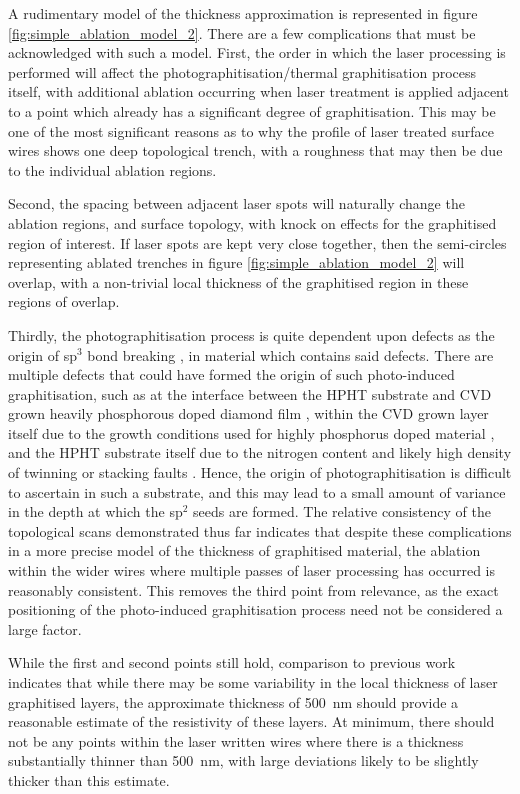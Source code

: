 \begin{refsection}
A rudimentary model of the thickness approximation is represented in figure \ref{fig:simple_ablation_model_2}. There are a few complications that must be acknowledged with such a model. First, the order in which the laser processing is performed will affect the photographitisation/thermal graphitisation process itself, with additional ablation occurring when laser treatment is applied adjacent to a point which already has a significant degree of graphitisation. This may be one of the most significant reasons as to why the profile of laser treated surface wires shows one deep topological trench, with a roughness that may then be due to the individual ablation regions. 

Second, the spacing between adjacent laser spots will naturally change the ablation regions, and surface topology, with knock on effects for the graphitised region of interest. If laser spots are kept very close together, then the semi-circles representing ablated trenches in figure \ref{fig:simple_ablation_model_2} will overlap, with a non-trivial local thickness of the graphitised region in these regions of overlap. 

Thirdly, the photographitisation process is quite dependent upon defects as the origin of sp$^{3}$ bond breaking \cite{kononenko2014-PI}, in material which contains said defects. There are multiple defects that could have formed the origin of such photo-induced graphitisation, such as at the interface between the HPHT substrate and CVD grown heavily phosphorous doped diamond film \cite{tallaire2011}, within the CVD grown layer itself due to the growth conditions used for highly phosphorus doped material \cite{grotjohn2014}, and the HPHT substrate itself due to the nitrogen content and likely high density of twinning or stacking faults \cite{Angus1992, sumiya2015}. Hence, the origin of photographitisation is difficult to ascertain in such a substrate, and this may lead to a small amount of variance in the depth at which the sp$^{2}$ seeds are formed. The relative consistency of the topological scans demonstrated thus far indicates that despite these complications in a more precise model of the thickness of graphitised material, the ablation within the wider wires where multiple passes of laser processing has occurred is reasonably consistent. This removes the third point from relevance, as the exact positioning of the photo-induced graphitisation process need not be considered a large factor. 

While the first and second points still hold, comparison to previous work indicates that while there may be some variability in the local thickness of laser graphitised layers, the approximate thickness of 500~\si{\nano\metre} should provide a reasonable estimate of the resistivity of these layers. At minimum, there should not be any points within the laser written wires where there is a thickness substantially thinner than 500~\si{\nano\metre}, with large deviations likely to be slightly thicker than this estimate. 


\end{refsection}
